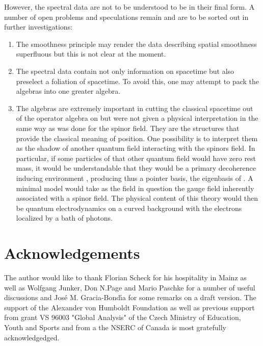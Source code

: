 \documentclass[a4paper,10pt,oneside]{amsart}
\theoremstyle{plain}
\theoremstyle{definition}
\theoremstyle{remark}
\begin{document}
However, the spectral data are not to be understood to be in their
final form. A number of open problems and speculations remain and are
to be sorted out in further investigations:



\begin{enumerate}
\item{The smoothness principle may render the data \coordHE{} describing
spatial smoothness superfluous but this is not clear at the
moment. }
\item{The spectral data contain not only information on spacetime
but also preselect a foliation of spacetime. To avoid this, one
may attempt to pack the algebras \coordHE{} into one greater
algebra.}
\item{The algebras \coordHE{} are extremely important in cutting the
classical spacetime out
of the operator algebra on \coordHE{}
but were not given a physical interpretation in the same way as
was done for the spinor field. They are the structures that
provide the classical meaning of position. One possibility is to
interpret them as the shadow of another quantum field interacting
with the spinors field. In particular, if some particles of that
other quantum field would have zero rest mass, it would be
understandable that they would be a primary decoherence inducing
environment \cite{Joos-Zeh,Zurek}, producing thus a pointer basis,
the eigenbasis of \coordHE{}. A minimal model would take as the
field in question the \coordHE{} gauge field inherently associated
with a spinor field. The physical content of this theory would then
be quantum electrodynamics on a curved background with the electrons
localized by a bath of photons.}
\end{enumerate}







\section{Acknowledgements}
The author would like to thank Florian Scheck for his hospitality
in Mainz as well as Wolfgang Junker, Don N.Page and Mario Paschke
for a number of useful discussions and Jos\'e M. Gracia-Bond\'{\i}a for
some remarks on a draft version. The support of the Alexander von
Humboldt Foundation as well as previous support from grant VS
96003 "Global Analysis" of the Czech Ministry of Education, Youth
and Sports and from a the NSERC of Canada is most gratefully
acknowledgedged.
\end{document}
